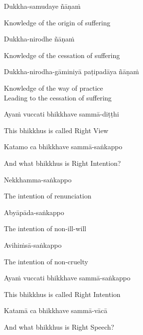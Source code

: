 Dukkha-samudaye ñāṇaṁ

\begin{english}
  Knowledge of the origin of suffering
\end{english}

Dukkha-nirodhe ñāṇaṁ

\begin{english}
  Knowledge of the cessation of suffering
\end{english}

Dukkha-nirodha-gāminiyā paṭipadāya ñāṇaṁ

\begin{english}
  Knowledge of the way of practice\\
  Leading to the cessation of suffering
\end{english}

Ayaṁ vuccati bhikkhave sammā-diṭṭhi

\begin{english}
  This bhikkhus is called Right View
\end{english}

Katamo ca bhikkhave sammā-saṅkappo

\begin{english}
  And what bhikkhus is Right Intention?
\end{english}

Nekkhamma-saṅkappo

\begin{english}
  The intention of renunciation
\end{english}

Abyāpāda-saṅkappo

\begin{english}
  The intention of non-ill-will
\end{english}

Avihiṁsā-saṅkappo

\begin{english}
  The intention of non-cruelty
\end{english}

Ayaṁ vuccati bhikkhave sammā-saṅkappo

\begin{english}
  This bhikkhus is called Right Intention
\end{english}

Katamā ca bhikkhave sammā-vācā

\begin{english}
  And what bhikkhus is Right Speech?
\end{english}

